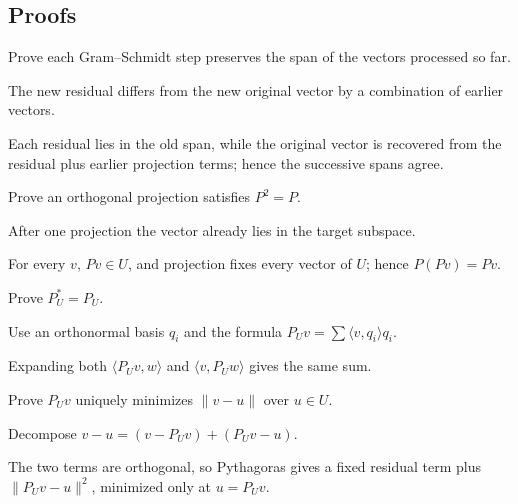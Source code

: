 \subsection*{Proofs}

\begin{exercise}\label{exr:i14-expand-06}
Prove each Gram--Schmidt step preserves the span of the vectors processed so far.
\end{exercise}
\begin{hint}
The new residual differs from the new original vector by a combination of earlier vectors.
\end{hint}
\begin{solution}
Each residual lies in the old span, while the original vector is recovered from the residual plus earlier projection terms; hence the successive spans agree.
\end{solution}

\begin{exercise}\label{exr:i14-expand-07}
Prove an orthogonal projection satisfies \(P^2=P\).
\end{exercise}
\begin{hint}
After one projection the vector already lies in the target subspace.
\end{hint}
\begin{solution}
For every \(v\), \(Pv\in U\), and projection fixes every vector of \(U\); hence \(P(Pv)=Pv\).
\end{solution}

\begin{exercise}\label{exr:i14-expand-08}
Prove \(P_U^*=P_U\).
\end{exercise}
\begin{hint}
Use an orthonormal basis \(q_i\) and the formula \(P_Uv=\sum\langle v,q_i\rangle q_i\).
\end{hint}
\begin{solution}
Expanding both \(\langle P_Uv,w\rangle\) and \(\langle v,P_Uw\rangle\) gives the same sum.
\end{solution}

\begin{exercise}\label{exr:i14-expand-09}
Prove \(P_Uv\) uniquely minimizes \(\|v-u\|\) over \(u\in U\).
\end{exercise}
\begin{hint}
Decompose \(v-u=(v-P_Uv)+(P_Uv-u)\).
\end{hint}
\begin{solution}
The two terms are orthogonal, so Pythagoras gives a fixed residual term plus \(\|P_Uv-u\|^2\), minimized only at \(u=P_Uv\).
\end{solution}

